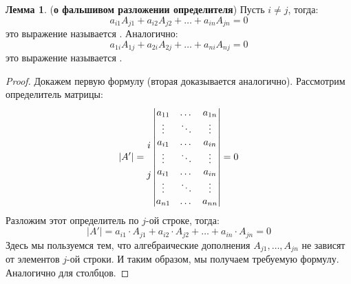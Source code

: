 \documentclass[12pt]{article}
\theoremstyle{definition}
\newtheorem{lemma}{Лемма}
\begin{document}
\begin{lemma}(\textbf{о фальшивом разложении определителя})
	Пусть $i \neq j$, тогда:
	$$
		a_{i1}A_{j1} + a_{i2}A_{j2} + \dotsc + a_{in}A_{jn} = 0
	$$
	это выражение называется . Аналогично:
	$$
		a_{1i}A_{1j} + a_{2i}A_{2j} + \dotsc + a_{ni}A_{nj} = 0
	$$
	это выражение называется .
\end{lemma}
\begin{proof}
	Докажем первую формулу (вторая доказывается аналогично). Рассмотрим определитель матрицы:
	$$
		|A'| = 
		\begin{matrix}
			\vphantom{a}\\
			\vphantom{\vdots}\\
			i\\
			\vphantom{\vdots}\\
			j\\
			\\
			\vphantom{a}
		\end{matrix}
		\begin{vmatrix}
			a_{11} & \dotsc & a_{1n}\\
			\vdots & \ddots & \vdots \\
			a_{i1} & \dotsc & a_{in}\\
			\vdots & \ddots & \vdots \\
			a_{i1} & \dotsc & a_{in}\\
			\vdots & \ddots & \vdots \\
			a_{n1} & \dotsc & a_{nn}
		\end{vmatrix} = 0
	$$
	Разложим этот определитель по $j$-ой строке, тогда:
	$$
		|A'| = a_{i1}{\cdot}A_{j1} + a_{i2}{\cdot}A_{j2} + \dotsc + a_{in}{\cdot}A_{jn} = 0
	$$
	Здесь мы пользуемся тем, что алгебраические дополнения $A_{j1},\dotsc, A_{jn}$ не зависят от элементов $j$-ой строки. И таким образом, мы получаем требуемую формулу. Аналогично для столбцов.
\end{proof}
\end{document}
